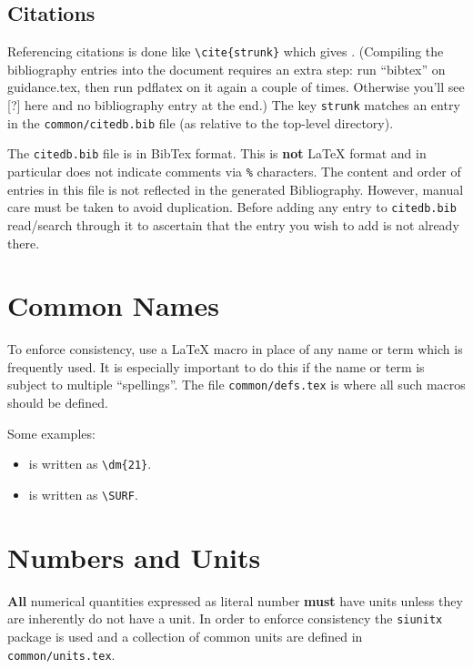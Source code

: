 \subsection{Citations}

Referencing citations is done like \verb|\cite{strunk}| which gives \cite{strunk}.
(Compiling the bibliography entries into the document requires an extra step: run ``bibtex'' on
 guidance.tex, then run pdflatex on it again a couple of times. Otherwise you'll see [?] here 
 and no bibliography entry at the end.) 
The key \texttt{strunk} matches an entry in the \texttt{common/citedb.bib}
file (as relative to the top-level directory).


The \texttt{citedb.bib} file is in BibTex format.
This is \textbf{not} \LaTeX{} format and in particular does not
indicate comments via \texttt{\%} characters.
The content and order of entries in this file is not reflected in the
generated Bibliography.
However, manual care must be taken to avoid duplication.
Before adding any entry to \texttt{citedb.bib} read/search through it
to ascertain that the entry you wish to add is not already there.

\section{Common Names}

To enforce consistency, use a \LaTeX{} macro in place of any name or
term which is frequently used.
It is especially important to do this if the name or term is subject
to multiple ``spellings''.
The file \texttt{common/defs.tex} is where all such macros should be defined.

Some examples:

\begin{itemize}
\item {} is written as \verb|\dm{21}|.
\item \SURF is written as \verb|\SURF|.
\end{itemize}

\section{Numbers and Units}

\textbf{All} numerical quantities expressed as literal number
\textbf{must} have units unless they are inherently do not have a unit.
In order to enforce consistency the \texttt{siunitx} package is used
and a collection of common units are defined in
\texttt{common/units.tex}.

